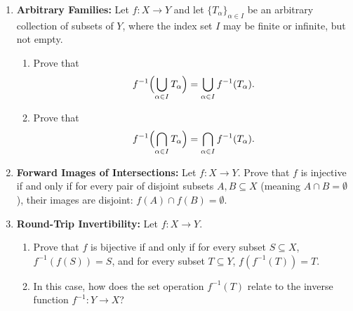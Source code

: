 \begin{enumerate}[resume]
\item \textbf{Arbitrary Families:} Let $f: X \to Y$ and let $\{T_\alpha\}_{\alpha \in I}$ be an arbitrary collection of subsets of $Y$, where the index set $I$ may be finite or infinite, but not empty.
\begin{enumerate}[label=(\alph*)]
\item Prove that
\[
f^{-1}\Bigl(\bigcup_{\alpha \in I} T_\alpha\Bigr) = \bigcup_{\alpha \in I} f^{-1}(T_\alpha).
\]
\item Prove that
\[
f^{-1}\Bigl(\bigcap_{\alpha \in I} T_\alpha\Bigr) = \bigcap_{\alpha \in I} f^{-1}(T_\alpha).
\]
\end{enumerate}

\item \textbf{Forward Images of Intersections:} Let $f: X \to Y$. Prove that $f$ is injective if and only if for every pair of disjoint subsets $A, B \subseteq X$ (meaning $A \cap B = \emptyset$), their images are disjoint: $f(A) \cap f(B) = \emptyset$.

\item \textbf{Round-Trip Invertibility:} Let $f: X \to Y$.
\begin{enumerate}[label=(\alph*)]
\item Prove that $f$ is bijective if and only if for every subset $S \subseteq X$, $f^{-1}(f(S)) = S$, and for every subset $T \subseteq Y$, $f(f^{-1}(T)) = T$.
\item In this case, how does the set operation $f^{-1}(T)$ relate to the inverse function $f^{-1}: Y \to X$?
\end{enumerate}
\end{enumerate}

\newpage
